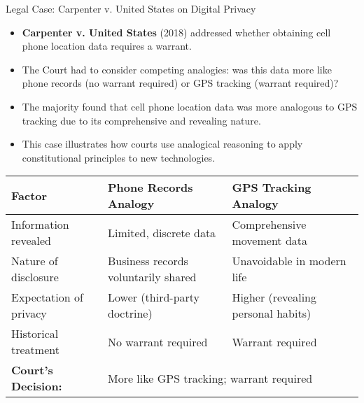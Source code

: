 \documentclass{beamer}
\begin{document}
\begin{frame}{Legal Case: Carpenter v. United States on Digital Privacy}
	\begin{itemize}
		\item \textbf{Carpenter v. United States} (2018) addressed whether obtaining cell phone location data requires a warrant.
		\item The Court had to consider competing analogies: was this data more like phone records (no warrant required) or GPS tracking (warrant required)?
		\item The majority found that cell phone location data was more analogous to GPS tracking due to its comprehensive and revealing nature.
		\item This case illustrates how courts use analogical reasoning to apply constitutional principles to new technologies.
	\end{itemize}
	
	\begin{table}
		\scriptsize
		\begin{tabular}{|p{3cm}|p{3.5cm}|p{3.5cm}|}
			\hline
			\textbf{Factor} & \textbf{Phone Records Analogy} & \textbf{GPS Tracking Analogy} \\
			\hline
			Information revealed & Limited, discrete data & Comprehensive movement data \\
			\hline
			Nature of disclosure & Business records voluntarily shared & Unavoidable in modern life \\
			\hline
			Expectation of privacy & Lower (third-party doctrine) & Higher (revealing personal habits) \\
			\hline
			Historical treatment & No warrant required & Warrant required \\
			\hline
			\textbf{Court's Decision:} & \multicolumn{2}{p{7cm}|}{More like GPS tracking; warrant required} \\
			\hline
		\end{tabular}
	\end{table}
\end{frame}	
\end{document}
